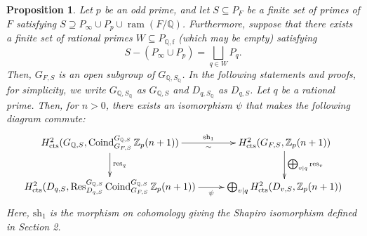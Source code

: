 \documentclass{article}
\numberwithin{equation}{section} %
\newtheorem{prop}[lemm]{Proposition}
\begin{document}
\begin{prop}
  \label{setjfiwnmtgongto4etmnoe4}
  Let $p$ be an odd prime, and let $S \subseteq P_F$ be a finite set of primes of $F$ satisfying $S \supseteq P_\infty \cup P_p \cup \operatorname{ram}(F/\mathbb{Q})$. Furthermore, suppose that there exists a finite set of rational primes $W \subseteq P_{\mathbb{Q},\mathrm{f}}$ (which may be empty) satisfying
  \[
    S - (P_\infty \cup P_p) = \bigsqcup_{q \in W} P_q.
  \]
  Then, $G_{F,S}$ is an open subgroup of $G_{\mathbb{Q},S_{\mathbb{Q}}}$. In the following statements and proofs, for simplicity, we write $G_{\mathbb{Q},S_{\mathbb{Q}}}$ as $G_{\mathbb{Q},S}$ and $D_{q,S_{\mathbb{Q}}}$ as $D_{q,S}$. Let $q$ be a rational prime. Then, for $n > 0$, there exists an isomorphism $\psi$ that makes the following diagram commute:
  \[
    \vcenter{
    \xymatrix@C=10pt{
     H^2_{\rm cts}(G_{\mathbb{Q},S}, \operatorname{Coind}_{G_{F,S}}^{G_{\mathbb{Q},S}}\mathbb{Z}_p(n+1)) \ar[d]^-{\mathrm{res}_q} \ar[rr]^-{\mathrm{sh}_{1}}_-{\sim} & & H^2_{\rm cts}(G_{F,S},\mathbb{Z}_p(n+1))  \ar[d]^-{\bigoplus_{v \mid q} \mathrm{res}_v} \\
      H^2_{\rm cts}(D_{q,S}, \operatorname{Res}_{D_{q,S}}^{G_{\mathbb{Q},S}}\operatorname{Coind}_{G_{F,S}}^{G_{\mathbb{Q},S}}\mathbb{Z}_p(n+1)) \ar[rr]_-{\psi} & & \bigoplus_{v\mid q} H^2_{\rm cts}(D_{v,S},\mathbb{Z} _p(n+1))
    }
    }
  \]
  Here, $\mathrm{sh}_1$ is the morphism on cohomology giving the Shapiro isomorphism defined in Section 2.
\end{prop}
\end{document}
